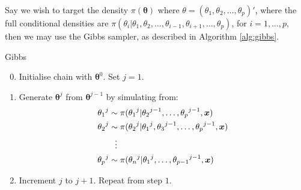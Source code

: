 Say we wish to target the density $\pi(\bm{\theta})$ where $\theta = (\theta_1, \theta_2, \dots, \theta_p)'$, where the full conditional densities are $\pi(\theta_i|\theta_1, \theta_2, \dots, \theta_{i-1}, \theta_{i+1}, \dots, \theta_p)$, for $i=1,\dots,p$, then we may use the Gibbs sampler, as described in Algorithm \ref{alg:gibbs}.

\begin{algorithm}
\caption{Gibbs}
\label{alg:gibbs}
\begin{enumerate}
    \setcounter{enumi}{-1}
    \item Initialise chain with $\bm{\theta}^{0}$. Set $j=1$.
    \item Generate $\bm{\theta}^{j}$ from $\bm{\theta}^{j-1}$ by simulating from:
    \begin{align*}
            {\theta_1}^{j} &\sim \pi({\theta_1}^{j}|{\theta_2}^{j-1},\dots,{\theta_p}^{j-1},\bm{x})\\
            {\theta_2}^{j} &\sim \pi({\theta_2}^{j}|{\theta_1}^{j}, {\theta_3}^{j-1}, \dots, {\theta_p}^{j-1},\bm{x})\\
            &\hspace{0.25cm}\vdots \\
            {\theta_p}^{j} &\sim \pi({\theta_n}^{j}|{\theta_1}^{j}, \dots, {\theta_{p-1}}^{j-1},\bm{x})
    \end{align*}
    \item Increment $j$ to $j+1$. Repeat from step $1$.
\end{enumerate}
\end{algorithm}

